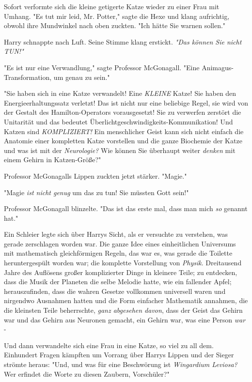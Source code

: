 {Sofort verformte sich die kleine getigerte Katze wieder zu einer Frau mit Umhang. "Es tut mir leid, Mr. Potter," sagte die Hexe und klang aufrichtig, obwohl ihre Mundwinkel nach oben zuckten. "Ich hätte Sie warnen sollen."

Harry schnappte nach Luft. Seine Stimme klang erstickt. \emph{"Das können Sie nicht TUN!"}

"Es ist nur eine Verwandlung," sagte Professor McGonagall. "Eine Animagus-Transformation, um genau zu sein."

"Sie haben sich in eine Katze verwandelt! Eine \emph{KLEINE} Katze! Sie haben den Energieerhaltungssatz verletzt! Das ist nicht nur eine beliebige Regel, sie wird von der Gestalt des Hamilton-Operators vorausgesetzt! Sie zu verwerfen zerstört die Unitarität und das bedeutet Überlichtgeschwindigkeits-Kommunikation! Und Katzen sind \emph{KOMPLIZIERT!} Ein menschlicher Geist kann sich nicht einfach die Anatomie einer kompletten Katze vorstellen und die ganze Biochemie der Katze und was ist mit der \emph{Neurologie?} Wie können Sie überhaupt weiter \emph{denken} mit einem Gehirn in Katzen-Größe?"

Professor McGonagalls Lippen zuckten jetzt stärker. "Magie."

"Magie \emph{ist nicht genug} um das zu tun! Sie müssten Gott sein!"

Professor McGonagall blinzelte. "Das ist das erste mal, dass man mich \emph{so} genannt hat."

Ein Schleier legte sich über Harrys Sicht, als er versuchte zu verstehen, was gerade zerschlagen worden war. Die ganze Idee eines einheitlichen Universums mit mathematisch gleichförmigen Regeln, das war es, was gerade die Toilette heruntergespült worden war; die komplette Vorstellung von \emph{Physik}. Dreitausend Jahre des Auflösens großer komplizierter Dinge in kleinere Teile; zu entdecken, dass die Musik der Planeten die selbe Melodie hatte, wie ein fallender Apfel; herauszufinden, dass die wahren Gesetze vollkommen universell waren und nirgendwo Ausnahmen hatten und die Form einfacher Mathematik annahmen, die die kleinsten Teile beherrschte, \emph{ganz abgesehen davon}, dass der Geist das Gehirn war und das Gehirn aus Neuronen gemacht, ein Gehirn war, was eine Person \emph{war} -

Und dann verwandelte sich eine Frau in eine Katze, so viel zu all dem.\\ Einhundert Fragen kämpften um Vorrang über Harrys Lippen und der Sieger strömte heraus: "Und, und was für eine Beschwörung ist \emph{Wingardium Leviosa?} Wer erfindet die Worte zu diesen Zaubern, Vorschüler?"

}
